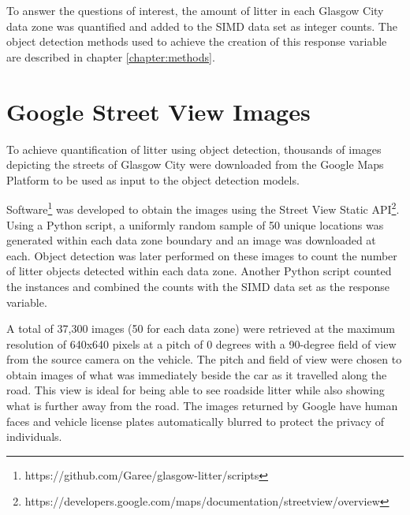 \documentclass{thesis}
\begin{document}
To answer the questions of interest, the amount of litter in each Glasgow City data zone was quantified and added to the SIMD data set as integer counts. The object detection methods used to achieve the creation of this response variable are described in chapter \ref{chapter:methods}.

\section{Google Street View Images}

To achieve quantification of litter using object detection, thousands of images depicting the streets of Glasgow City were downloaded from the Google Maps Platform to be used as input to the object detection models. 

Software\footnote{https://github.com/Garee/glasgow-litter/scripts} was developed to obtain the images using the Street View Static API\footnote{https://developers.google.com/maps/documentation/streetview/overview}. Using a Python script, a uniformly random sample of 50 unique locations was generated within each data zone boundary and an image was downloaded at each. Object detection was later performed on these images to count the number of litter objects detected within each data zone. Another Python script counted the instances and combined the counts with the SIMD data set as the response variable. 

A total of 37,300 images (50 for each data zone) were retrieved at the maximum resolution of 640x640 pixels at a pitch of 0 degrees with a 90-degree field of view from the source camera on the vehicle. The pitch and field of view were chosen to obtain images of what was immediately beside the car as it travelled along the road. This view is ideal for being able to see roadside litter while also showing what is further away from the road. The images returned by Google have human faces and vehicle license plates automatically blurred to protect the privacy of individuals.
\end{document}

